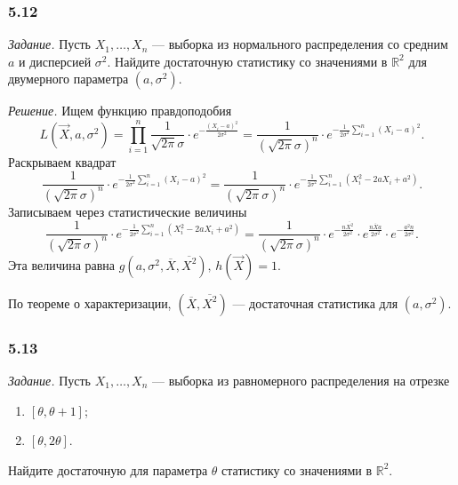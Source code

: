\subsubsection*{5.12}

\textit{Задание.}
Пусть $X_1, \dotsc, X_n$ ---
выборка из нормального распределения со средним $a$ и дисперсией $ \sigma^2$.
Найдите достаточную статистику со значениями в $ \mathbb{R}^2$ для двумерного параметра
$ \left( a, \sigma^2 \right) $.

\textit{Решение.} Ищем функцию правдоподобия
$$L \left( \vec{X}, a, \sigma^2 \right) =
  \prod \limits_{i = 1}^n
    \frac{1}{ \sqrt{2 \pi } \sigma } \cdot e^{- \frac{ \left( X_i - a \right)^2}{2 \sigma^2}} =
  \frac{1}{ \left( \sqrt{2 \pi } \sigma \right)^n} \cdot
  e^{- \frac{1}{2 \sigma^2} \sum \limits_{i = 1}^n \left( X_i - a \right)^2}.$$
Раскрываем квадрат
$$ \frac{1}{ \left( \sqrt{2 \pi } \sigma \right)^n} \cdot
  e^{- \frac{1}{2 \sigma^2} \sum \limits_{i = 1}^n \left( X_i - a \right)^2} =
  \frac{1}{ \left( \sqrt{2 \pi } \sigma \right)^n} \cdot
  e^{- \frac{1}{2 \sigma^2} \sum \limits_{i = 1}^n \left( X_i^2 - 2aX_i + a^2 \right) }.$$
Записываем через статистические величины
$$ \frac{1}{ \left( \sqrt{2 \pi } \sigma \right)^n} \cdot
  e^{- \frac{1}{2 \sigma^2} \sum \limits_{i = 1}^n \left( X_i^2 - 2aX_i + a^2 \right) } =
  \frac{1}{ \left( \sqrt{2 \pi } \sigma \right)^n} \cdot
  e^{- \frac{n \overline{X^2}}{2 \sigma^2}} \cdot e^{ \frac{n \overline{X} a}{2 \sigma^2}} \cdot
  e^{- \frac{a^2 n}{2 \sigma^2}}.$$
Эта величина равна
$g \left( a, \sigma^2, \overline{X}, \overline{X^2} \right), \,
  h \left( \vec{X} \right) = 1$.

По теореме о характеризации, $ \left( \overline{X}, \overline{X^2} \right) $ ---
достаточная статистика для $ \left( a, \sigma^2 \right) $.

\subsubsection*{5.13}

\textit{Задание.} Пусть $X_1, \dotsc, X_n$ --- выборка из равномерного распределения на отрезке
\begin{enumerate}[label=\alph*)]
  \item $ \left[ \theta, \theta + 1 \right] $;
  \item $ \left[ \theta, 2 \theta \right] $.
\end{enumerate}
Найдите достаточную для параметра $ \theta $ статистику со значениями в $ \mathbb{R}^2$.


